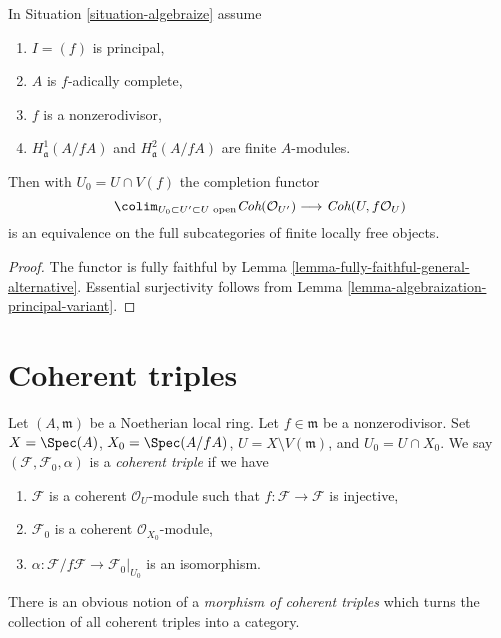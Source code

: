 \begin{lemma}
\label{lemma-equivalence}
In Situation \ref{situation-algebraize} assume
\begin{enumerate}
\item $I = (f)$ is principal,
\item $A$ is $f$-adically complete,
\item $f$ is a nonzerodivisor,
\item $H^1_\mathfrak a(A/fA)$ and $H^2_\mathfrak a(A/fA)$
are finite $A$-modules.
\end{enumerate}
Then with $U_0 = U \cap V(f)$ the completion functor
$$
\colim_{U_0 \subset U' \subset U\text{ open}}
\textit{Coh}(\mathcal{O}_{U'})
\longrightarrow
\textit{Coh}(U, f\mathcal{O}_U)
$$
is an equivalence on the full subcategories of finite locally free objects.
\end{lemma}

\begin{proof}
The functor is fully faithful by
Lemma \ref{lemma-fully-faithful-general-alternative}.
Essential surjectivity follows from
Lemma \ref{lemma-algebraization-principal-variant}.
\end{proof}








\section{Coherent triples}
\label{section-coherent-triples}

\noindent
Let $(A, \mathfrak m)$ be a Noetherian local ring.
Let $f \in \mathfrak m$ be a nonzerodivisor. Set
$X = \Spec(A)$, $X_0 = \Spec(A/fA)$, $U = X \setminus V(\mathfrak m)$, and
$U_0 = U \cap X_0$.
We say $(\mathcal{F}, \mathcal{F}_0, \alpha)$ is a {\it coherent triple}
if we have
\begin{enumerate}
\item $\mathcal{F}$ is a coherent $\mathcal{O}_U$-module such that
$f : \mathcal{F} \to \mathcal{F}$ is injective,
\item $\mathcal{F}_0$ is a coherent $\mathcal{O}_{X_0}$-module,
\item $\alpha : \mathcal{F}/f\mathcal{F} \to \mathcal{F}_0|_{U_0}$
is an isomorphism.
\end{enumerate}
There is an obvious notion of a {\it morphism of coherent triples}
which turns the collection of all coherent triples into a category.

